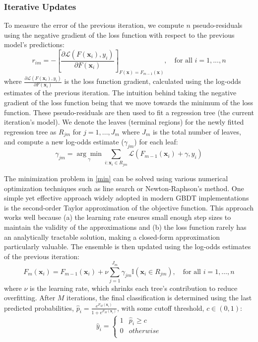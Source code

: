 \documentclass{article}
\begin{document}
\subsubsection*{Iterative Updates}
To measure the error of the previous iteration, we compute $n$ pseudo-residuals using the negative gradient of the loss function with respect to the previous model's predictions:
\begin{equation}
    r_{im}=-\left[\frac{\partial \mathcal{L}(F(\textbf{x}_i),y_i)}{\partial F(\textbf{x}_i)}\right]_{F(\textbf{x})=F_{m-1}(\textbf{x})},\quad \text{for all } i=1,...,n
\end{equation}
where $\frac{\partial \mathcal{L}(F(\textbf{x}_i),y_i)}{\partial F(\textbf{x}_i)}$ is the loss function gradient, calculated using the log-odds estimates of the previous iteration. The intuition behind taking the negative gradient of the loss function being that we move towards the minimum of the loss function. These pseudo-residuals are then used to fit a regression tree (the current iteration's model). We denote the leaves (terminal regions) for the newly fitted regression tree as $R_{jm}$ for $j=1,...,J_m$ where $J_m$ is the total number of leaves, and compute a new log-odds estimate ($\gamma_{jm}$) for each leaf:
\begin{equation}
    \gamma_{jm}=\underset{\gamma}{\arg\!\min} \sum_{i:\textbf{x}_i \in R_{jm}}\mathcal{L}(F_{m-1}(\textbf{x}_i)+\gamma,y_i)
    \label{min}
\end{equation}

The minimization problem in \eqref{min} can be solved using various numerical optimization techniques such as line search or Newton-Raphson's method. One simple yet effective approach widely adopted in modern GBDT implementations is the second-order Taylor approximation of the objective function.\cite{XGBoost, LightGBM,CatBoost} This approach works well because (a) the learning rate ensures small enough step sizes to maintain the validity of the approximations and (b) the loss function rarely has an analytically tractable solution, making a closed-form approximation particularly valuable. The ensemble is then updated using the log-odds estimates of the previous iteration:
\begin{equation}
    F_m(\textbf{x}_i)=F_{m-1}(\textbf{x}_i)+\nu \sum_{j=1}^{J_m}\gamma_{jm}\mathbb{I}(\textbf{x}_i \in R_{jm}),\quad \text{for all } i = 1,\dots,n
\end{equation}
where $\nu$ is the learning rate, which shrinks each tree's contribution to reduce overfitting. After $M$ iterations, the final classification is determined using the last predicted probabilities, $\hat p_i=\frac{e^{F_M(\textbf{x}_i)}}{1+e^{F_M(\textbf{x}_i)}}$, with some cutoff threshold, $c \in (0,1)$:
\begin{equation}
  \hat y_i =
    \begin{cases}
      1 & \hat p_i\ge c\\
      0 & otherwise\\
    \end{cases}       
\end{equation}
\end{document}
